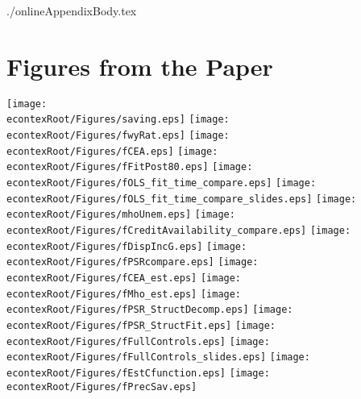 \documentclass{\econtex}
\begin{document}
\begin{verbatimwrite}{./onlineAppendixBody.tex}
\section{Figures from the Paper}
\texttt{[image: \\econtexRoot/Figures/saving.eps]}
\texttt{[image: \\econtexRoot/Figures/fwyRat.eps]}
\texttt{[image: \\econtexRoot/Figures/fCEA.eps]}
\texttt{[image: \\econtexRoot/Figures/fFitPost80.eps]}
\texttt{[image: \\econtexRoot/Figures/fOLS\_fit\_time\_compare.eps]}
\texttt{[image: \\econtexRoot/Figures/fOLS\_fit\_time\_compare\_slides.eps]}
\texttt{[image: \\econtexRoot/Figures/mhoUnem.eps]}
\texttt{[image: \\econtexRoot/Figures/fCreditAvailability\_compare.eps]}
\texttt{[image: \\econtexRoot/Figures/fDispIncG.eps]}
\texttt{[image: \\econtexRoot/Figures/fPSRcompare.eps]}
\texttt{[image: \\econtexRoot/Figures/fCEA\_est.eps]}
\texttt{[image: \\econtexRoot/Figures/fMho\_est.eps]}
\texttt{[image: \\econtexRoot/Figures/fPSR\_StructDecomp.eps]}
\texttt{[image: \\econtexRoot/Figures/fPSR\_StructFit.eps]}
\texttt{[image: \\econtexRoot/Figures/fFullControls.eps]}
\texttt{[image: \\econtexRoot/Figures/fFullControls\_slides.eps]}
\texttt{[image: \\econtexRoot/Figures/fEstCfunction.eps]}
\texttt{[image: \\econtexRoot/Figures/fPrecSav.eps]}

\end{verbatimwrite}



\end{document}
